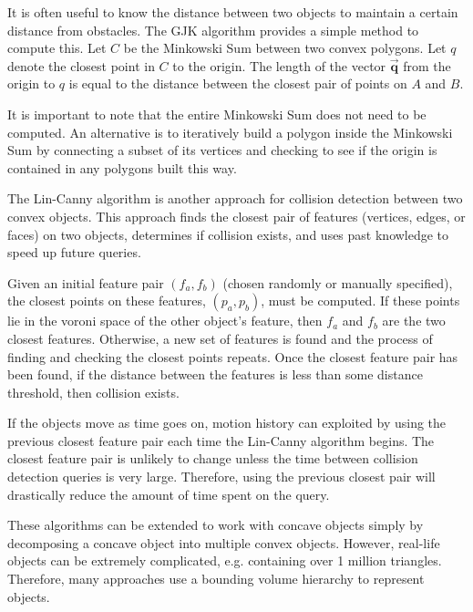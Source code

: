 \documentclass[10pt,conference]{ieeeconf}
\begin{document}
	It is often useful to know the distance between two objects to maintain a certain distance from obstacles. The GJK algorithm provides a simple method to compute this. Let $C$ be the Minkowski Sum between two convex polygons. Let $q$ denote the closest point in $C$ to the origin. The length of the vector $\vec{\textbf{q}}$ from the origin to $q$ is equal to the distance between the closest pair of points on $A$ and $B$. 
	
	
	It is important to note that the entire Minkowski Sum does not need to be computed. An alternative is to iteratively build a polygon inside the Minkowski Sum by connecting a subset of its vertices and checking to see if the origin is contained in any polygons built this way. 
	
	The Lin-Canny algorithm \cite{lin1991fast} is another approach for collision detection between two convex objects. This approach finds the closest pair of features (vertices, edges, or faces) on two objects, determines if collision exists, and uses past knowledge to speed up future queries. 
	
	Given an initial feature pair $(f_a, f_b)$ (chosen randomly or manually specified), the closest points on these features, $(p_a, p_b)$, must be computed. If these points lie in the voroni space of the other object's feature, then $f_a$ and $f_b$ are the two closest features. Otherwise, a new set of features is found and the process of finding and checking the closest points repeats. Once the closest feature pair has been found, if the distance between the features is less than some distance threshold, then collision exists.
	
	If the objects move as time goes on, motion history can exploited by using the previous closest feature pair each time the Lin-Canny algorithm begins. The closest feature pair is unlikely to change unless the time between collision detection queries is very large. Therefore, using the previous closest pair will drastically reduce the amount of time spent on the query. 
	
	These algorithms can be extended to work with concave objects simply by decomposing a concave object into multiple convex objects. However, real-life objects can be extremely complicated, e.g. containing over 1 million triangles. Therefore, many approaches use a bounding volume hierarchy to represent objects.
	
\end{document}
